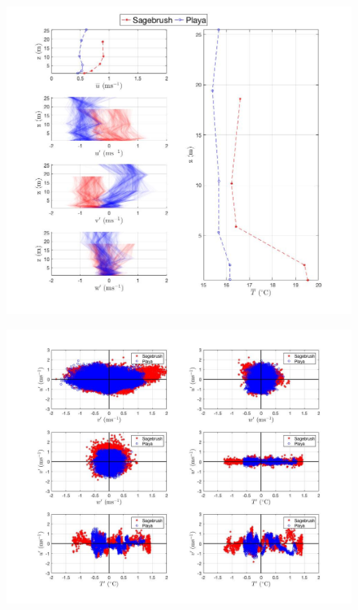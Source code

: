 \documentclass[]{article}
\begin{document}
\begin{figure}
	\centering
	\includegraphics[width=\textwidth]{u_T}
	\caption{}
	\label{fig:u_T}
\end{figure}

\begin{figure}
	\centering
	\includegraphics[width=\textwidth]{momentum_corr_05m}
	\caption{}
	\label{fig:u_T}
\end{figure}
\end{document}
